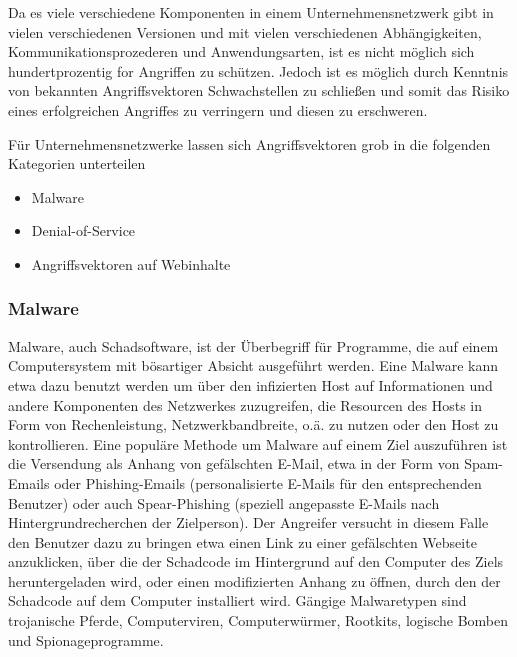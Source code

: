 Da es viele verschiedene Komponenten in einem Unternehmensnetzwerk gibt in vielen verschiedenen Versionen und mit vielen verschiedenen Abhängigkeiten, Kommunikationsprozederen und Anwendungsarten, ist es nicht möglich sich hundertprozentig for Angriffen zu schützen. Jedoch ist es möglich durch Kenntnis von bekannten Angriffsvektoren Schwachstellen zu schließen und somit das Risiko eines erfolgreichen Angriffes zu verringern und diesen zu erschweren.

Für Unternehmensnetzwerke lassen sich Angriffsvektoren grob in die folgenden Kategorien unterteilen \citep{Campbell2016}
\begin{itemize}
\item \glqq Malware\grqq 
\item \glqq Denial-of-Service\grqq
\item \glqq Angriffsvektoren auf Webinhalte \grqq
\end{itemize}


\subsubsection{Malware}
Malware, auch Schadsoftware, ist der Überbegriff für Programme, die auf einem Computersystem mit bösartiger Absicht ausgeführt werden. Eine Malware kann etwa dazu benutzt werden um über den infizierten Host auf Informationen und andere Komponenten des Netzwerkes zuzugreifen, die Resourcen des Hosts in Form von Rechenleistung, Netzwerkbandbreite, o.ä. zu nutzen oder den Host zu kontrollieren.
Eine populäre Methode um Malware auf einem Ziel auszuführen ist die Versendung als Anhang von gefälschten E-Mail, etwa in der Form von Spam-Emails oder  Phishing-Emails (personalisierte E-Mails für den entsprechenden Benutzer) oder auch Spear-Phishing (speziell angepasste E-Mails nach Hintergrundrecherchen der Zielperson). Der Angreifer versucht in diesem Falle den Benutzer dazu zu bringen etwa einen Link zu einer gefälschten Webseite anzuklicken, über die der Schadcode im Hintergrund auf den Computer des Ziels heruntergeladen wird, oder einen modifizierten Anhang zu öffnen, durch den der Schadcode auf dem Computer installiert wird. Gängige Malwaretypen sind trojanische Pferde, Computerviren, Computerwürmer, \glqq Rootkits\grqq , logische Bomben  und Spionageprogramme\citep{Campbell2016}.

